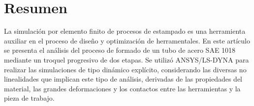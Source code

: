 \chapter*{Resumen}

La simulación por elemento finito de procesos de estampado es una herramienta auxiliar en el 
proceso de diseño y optimización de herramentales. En este artículo se presenta el análisis 
del proceso de formado de un tubo de acero SAE 1018 mediante un troquel progresivo de dos etapas. 
Se utilizó ANSYS/LS-DYNA para realizar las simulaciones de tipo dinámico explícito, considerando 
las diversas no linealidades que implican este tipo de análisis, derivadas de las propiedades 
del material, las grandes deformaciones y los contactos entre las herramientas y la pieza de trabajo. 